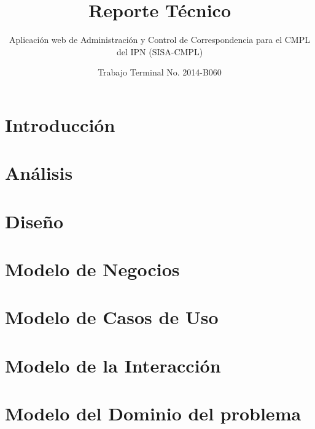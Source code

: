 \documentclass[oneside,10pt]{book}
\title{Reporte Técnico}
\subtitle{Aplicación web de Administración y Control de Correspondencia para el CMPL del IPN (SISA-CMPL)}
\author{Trabajo Terminal No. 2014-B060}
\begin{document}
\maketitle
\thispagestyle{empty}

\frontmatter
\tableofcontents

\mainmatter

\chapter{Introducción}




\chapter{Análisis}


\chapter{Diseño}



\chapter{Modelo de Negocios}


\chapter{Modelo de Casos de Uso}
	

\chapter{Modelo de la Interacción}




\chapter{Modelo del Dominio del problema}

	
\end{document}
